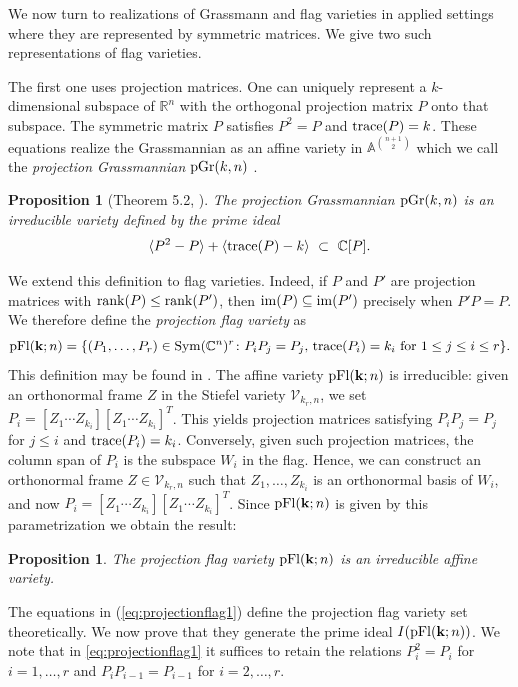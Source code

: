 \documentclass[12pt]{extarticle}
\newtheorem{proposition}[theorem]{Proposition}
\theoremstyle{definition}
\numberwithin{theorem}{section}
\newcommand{\RR}{\mathbb{R}}
\newcommand{\CC}{\mathbb{C}}
\begin{document}
We now turn to realizations of Grassmann and flag varieties in applied settings where they are represented by symmetric matrices. 
We give two such representations of flag varieties. 

The first one uses projection matrices. 
One can uniquely represent a $k$-dimensional subspace of $\RR^n$ with the orthogonal projection matrix $P$  onto that subspace. 
The symmetric matrix $P$ satisfies $P^2 =P$ and ${\rm trace}(P) = k$. 
These equations realize the Grassmannian as an affine variety in ${\mathbb A}^{\binom{n+1}{2}}$ which we call the 
 \emph{projection Grassmannian} ${\rm pGr}(k,n)$ \cite{DFRS,LY24a}. 

\begin{proposition}[Theorem 5.2, \cite{DFRS}] The projection Grassmannian ${\rm pGr}(k,n)$ is an irreducible variety defined by the prime ideal
$$ \langle P^2 - P \rangle + \langle {\rm trace}(P) -  k \rangle \,\, \subset  \,\, \CC[P].$$  
\end{proposition}
We extend this definition to flag varieties. 
Indeed, if $P$ and $P'$ are projection matrices with ${\rm rank}(P) \leq {\rm rank}(P')$, then ${\rm im}(P) \subseteq {\rm im} (P')$ precisely when $P'P = P$.
We therefore define the \emph{projection flag variety} as 
\begin{align}\label{eq:projectionflag1}
    {\rm pFl}({\bf k}; n) = \{(P_1, \ldots, P_r) \in {\rm Sym}(\CC^n)^r \colon P_iP_j = P_j,\, {\rm trace}(P_i) = k_i \textrm{ for $1 \leq j \leq i\leq r$}\}. 
\end{align}
This definition may be found in \cite[Proposition 17]{YWL}.
The affine variety ${\rm pFl}({\bf k};n)$ is irreducible: given an orthonormal frame $Z$ in the Stiefel variety $\mathcal V_{k_r,n}$, we set $P_i = [Z_1 
 \cdots Z_{k_i}] [Z_1 \cdots Z_{k_i}]^T$. This yields projection matrices satisfying $P_iP_j = P_j$ for $j\leq i$
 and ${\rm trace}(P_i)=k_i$. Conversely, given such projection matrices, the column span of $P_i$ is the subspace $W_i$ in the flag. Hence, we can construct an orthonormal frame $Z \in \mathcal V_{k_r,n}$ such that $Z_1, \ldots, Z_{k_i}$ is an orthonormal basis of $W_i$, and now $P_i = [Z_1 
 \cdots Z_{k_i}] [Z_1 \cdots Z_{k_i}]^T$. Since ${\rm pFl}({\bf k};n)$ is given by this parametrization we obtain the result:
 \begin{proposition}
  The projection flag variety ${\rm pFl}({\bf k}; n)$ is an irreducible affine variety.  
 \end{proposition}
The equations in (\ref{eq:projectionflag1}) define the projection flag variety set theoretically.
We now prove that they generate the prime ideal $I({\rm pFl}({\bf k}; n))$. We note that in \eqref{eq:projectionflag1} it suffices to retain the relations $P_i^2 = P_i$ for $i = 1, \ldots, r$ and  $P_iP_{i-1}=P_{i-1}$ for $i=2,\ldots, r$. 
\end{document}
